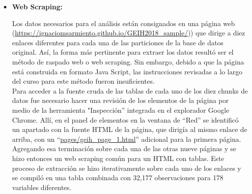 \documentclass[12pt,a4paper,onecolumn]{article}
\begin{document}
\begin{itemize}
\item \textbf{Web Scraping:}

Los datos necesarios para el análisis están consignados en una página web (\url{https://ignaciomsarmiento.github.io/GEIH2018_sample/})) que dirige a diez enlaces diferentes para cada una de las particiones de la base de datos original. Así, la forma más pertinente para extraer los datos resultó ser el método de raspado web o web scraping.  Sin embargo, debido a que la página está construida en formato Java Script, las instrucciones revisadas a lo largo del curso para este método fueron insuficientes.\\

Para acceder a la fuente cruda de las tablas de cada uno de los diez chunks de datos fue necesario hacer una revisión de los elementos de la página por medio de la herramienta "Inspección” integrada en el explorador Google Chrome. Allí, en el panel de elementos en la ventana de “Red” se identificó un apartado con la fuente HTML de la página, que dirigía al mismo enlace de arriba, con un “\url{pages/geih_page_1.html}” adicional para la primera página. Agregando esa terminación sobre cada una de las otras nueve páginas y se hizo entonces un web scraping común para un HTML con tablas. Este proceso de extracción se hizo iterativamente sobre cada uno de los enlaces y se compiló en una tabla combinada con 32,177 observaciones para 178 variables diferentes.\\  

\end{itemize}
\end{document}
